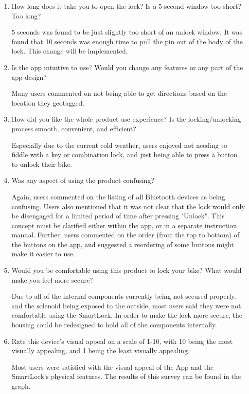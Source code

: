 \documentclass[12pt, titlepage]{article}
\begin{document}
\begin{enumerate}
    \item How long does it take you to open the lock? Is a 5-second window too short? Too long?

    5 seconds was found to be just slightly too short of an unlock window. It was found that 10 seconds was enough time to pull the pin out of the body of the lock. This change will be implemented. 
    
    \item Is the app intuitive to use? Would you change any features or any part of the app design?

    Many users commented on not being able to get directions based on the location they geotagged. 
    
    \item How did you like the whole product use experience? Is the locking/unlocking process smooth, convenient, and efficient?

    Especially due to the current cold weather, users enjoyed not needing to fiddle with a key or combination lock, and just being able to press a button to unlock their bike. 
    
    \item Was any aspect of using the product confusing?

    Again, users commented on the listing of all Bluetooth devices as being confusing. Users also mentioned that it was not clear that the lock would only be disengaged for a limited period of time after pressing "Unlock". This concept must be clarified either within the app, or in a separate instruction manual. Further, users commented on the order (from the top to bottom) of the buttons on the app, and suggested a reordering of some buttons might make it easier to use.
    
    \item Would you be comfortable using this product to lock your bike? What would make you feel more secure?

    Due to all of the internal components currently being not secured properly, and the solenoid being exposed to the outside, most users said they were not comfortable using the SmartLock. In order to make the lock more secure, the housing could be redesigned to hold all of the components internally. 
    
    \item Rate this device's visual appeal on a scale of 1-10, with 10 being the most visually appealing, and 1 being the least visually appealing.
    
    Most users were satisfied with the visual appeal of the App and the SmartLock's physical features. The results of this survey can be found in the  graph.
    
\end{enumerate}
\end{document}
